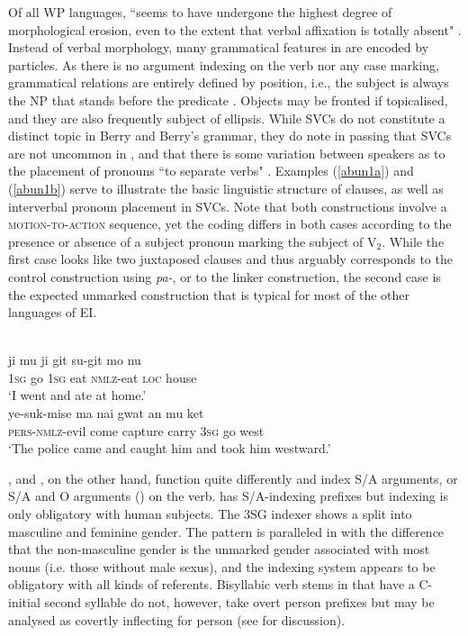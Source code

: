 Of all WP languages,  ``seems to have undergone the highest degree of morphological erosion, even to the extent that verbal affixation is totally absent" \citep[205]{reesink2005west}. Instead of verbal morphology, many grammatical features in  are encoded by particles. As there is no argument indexing on the verb nor any case marking,  grammatical relations are entirely defined by position, i.e., the subject is always the NP that stands before the predicate \citep[51]{berry1999}. Objects may be fronted if topicalised, and they are also frequently subject of ellipsis. While SVCs do not constitute a distinct topic in Berry and Berry's grammar, they do note in passing that SVCs are not uncommon in , and that there is some variation between speakers as to the placement of pronouns ``to separate verbs" \citep[51]{berry1999}. Examples (\ref{abun1a}) and (\ref{abun1b}) serve to illustrate the basic linguistic structure of  clauses, as well as interverbal pronoun placement in SVCs. Note that both constructions involve a \textsc{motion-to-action} sequence, yet the coding differs in both cases according to the presence or absence of a subject pronoun marking the subject of V$_2$. While the first case looks like two juxtaposed clauses and thus arguably corresponds to the  control construction using \textit{pa-}, or to the  linker construction, the second case is the expected unmarked construction that is typical for most of the other languages of EI.

\ea
{}\\
\ea \label{abun1a}
\gll ji mu ji git su-git mo nu \\
\textsc{1}\textsc{sg} go \textsc{1}\textsc{sg} eat \textsc{nmlz}-eat \textsc{loc} house \\
\glft `I went and ate at home.' \\
\ex \label{abun1b}
\gll ye-suk-mise ma nai gwat an mu ket \\ 
\textsc{pers}-\textsc{nmlz}-evil come capture carry \textsc{3}\textsc{sg} go west \\
\glft `The police came and caught him and took him westward.'
\z
\z

,  and , on the other hand, function quite differently and index S/A arguments, or S/A and O arguments () on the verb.  has S/A-indexing prefixes but indexing is only obligatory with human subjects. The 3SG indexer shows a split into masculine and feminine gender. The  pattern is paralleled in  with the difference that the non-masculine gender is the unmarked gender associated with most nouns (i.e. those without male sexus), and the indexing system appears to be obligatory with all kinds of referents. Bisyllabic verb stems in  that have a C-initial second syllable do not, however, take overt person prefixes but may be analysed as covertly inflecting for person (see \citealt[52f.]{dol2007grammar} for discussion).

